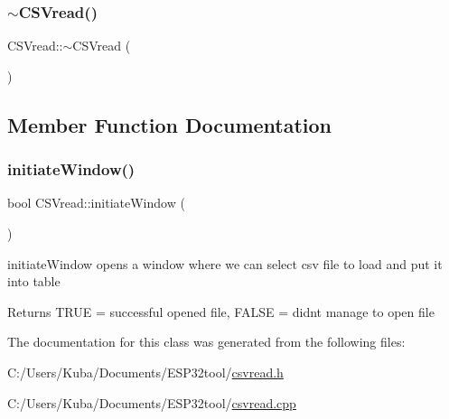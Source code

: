 \mbox{\label{class_c_s_vread_a8cac0f7ebeaed0c74581791229ab9b25}} 
\subsubsection{\texorpdfstring{$\sim$\+C\+S\+Vread()}{~CSVread()}}
{\footnotesize\ttfamily C\+S\+Vread\+::$\sim$\+C\+S\+Vread (\begin{DoxyParamCaption}{ }\end{DoxyParamCaption})}



\subsection{Member Function Documentation}
\mbox{\label{class_c_s_vread_a919b38bb6b737c7c9cbe5048e6e4b472}} 
\subsubsection{\texorpdfstring{initiate\+Window()}{initiateWindow()}}
{\footnotesize\ttfamily bool C\+S\+Vread\+::initiate\+Window (\begin{DoxyParamCaption}{ }\end{DoxyParamCaption})}



initiate\+Window opens a window where we can select csv file to load and put it into table 

\begin{DoxyReturn}{Returns}
T\+R\+UE = successful opened file, F\+A\+L\+SE = didn\textquotesingle{}t manage to open file 
\end{DoxyReturn}


The documentation for this class was generated from the following files\+:\begin{DoxyCompactItemize}
\item 
C\+:/\+Users/\+Kuba/\+Documents/\+E\+S\+P32tool/\hyperlink{csvread_8h}{csvread.\+h}\item 
C\+:/\+Users/\+Kuba/\+Documents/\+E\+S\+P32tool/\hyperlink{csvread_8cpp}{csvread.\+cpp}\end{DoxyCompactItemize}
